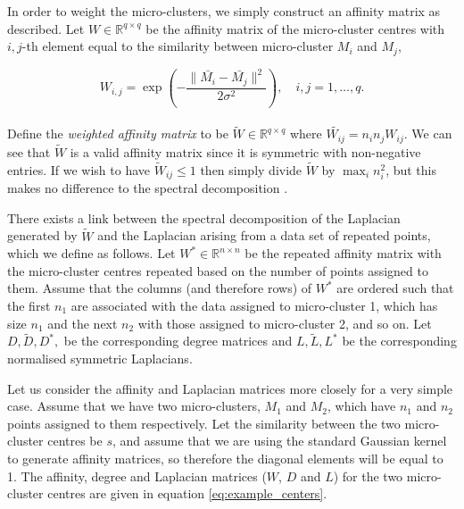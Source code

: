 In order to weight the micro-clusters, we simply construct an affinity matrix as described. Let $W \in \mathbb{R}^{q \times q}$ be the affinity matrix of the micro-cluster centres with $i,j$-th element equal to the similarity between micro-cluster $M_i$ and $M_j$, 

\[ W_{i,j} = \exp \left(- \frac{\| \bar{M_i} - \bar{M_j}\|^2}{2 \sigma^2} \right), \quad i, j = 1, \ldots, q. \]
\\
Define the \textit{weighted affinity matrix} to be $\tilde{W} \in \mathbb{R}^{q \times q}$ where $ \tilde{W_{ij}} = n_in_jW_{ij}$. We can see that $\tilde{W}$ is a valid affinity matrix since it is symmetric with non-negative entries. If we wish to have $\tilde{W}_{ij} \leq 1$ then simply divide $\tilde{W}$ by $\max_i n_i^2$, but this makes no difference to the spectral decomposition \citep{Luxburg2008}. 

There exists a link between the spectral decomposition of  the Laplacian generated by $\tilde{W}$ and the Laplacian arising from a data set of repeated points, which we define as follows.  Let $W^* \in \mathbb{R}^{n \times n}$ be the repeated affinity matrix with the micro-cluster centres repeated based on the number of points assigned to them. Assume that the columns (and therefore rows) of $W^*$ are ordered such that the first $n_1$ are associated with the data assigned to micro-cluster 1, which has size $n_1$ and the next $n_2$ with those assigned to micro-cluster 2, and so on. Let $D, \tilde{D}, D^{*},$ be the corresponding degree matrices and $L, \tilde{L}, L^{*}$ be the corresponding normalised symmetric Laplacians.

Let us consider the affinity and Laplacian matrices more closely for a very simple case. Assume that we have two micro-clusters, $M_1$ and $M_2$,  which have $n_1$ and $n_2$ points assigned to them respectively. Let the similarity between the two micro-cluster centres be $s$, and assume that we are using the standard Gaussian kernel to generate affinity matrices, so therefore the diagonal elements will be equal to 1. The affinity, degree and Laplacian matrices ($W$, $D$ and $L$) for the two micro-cluster centres are given in equation \eqref{eq:example_centers}.

